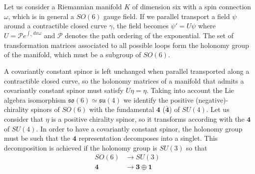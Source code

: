 Let us consider a Riemannian manifold $K$ of dimension six with a spin connection $\omega$, which 
is in general a $SO(6)$ gauge field.
If we parallel transport a field $\psi$ around a contractible closed curve $\gamma$, the field becomes
$\psi'=U\psi$ where $U=\mathcal P e^{\int_\gamma dx \omega}$ and $\mathcal P$ denotes the path ordering of 
the exponential.
The set of transformation matrices associated to all possible loops form the holonomy group of the manifold, 
which must be a subgroup of $SO(6)$.

A covariantly constant spinor is left unchanged when parallel transported along a contractible
closed curve, so the holonomy matrices of a manifold that admits a covariantly constant spinor 
must satisfy $U\eta = \eta$.
Taking into account the Lie algebra isomorphism $\mathfrak{so}(6)\simeq \mathfrak{su}(4)$ we identify the positive
(negative)-chirality spinors of $SO(6)$ with the fundamental $\mathbf 4$ ($\mathbf {\bar 4}$)
of $SU(4)$.
Let us consider that $\eta$ is a positive chirality spinor, so it transforms according with the 
$\mathbf 4$ of $SU(4)$.
In order to have a covariantly constant spinor, the holonomy group must be such that the $\mathbf 4$
representation decomposes into a singlet.
This decomposition is achieved if the holonomy group is $SU(3)$ so that
 \begin{align}
  SO(6)  &\to SU(3)\\
  \mathbf 4 &\to \mathbf 3 \oplus \mathbf 1
\end{align} 


